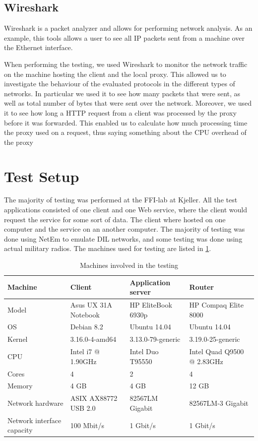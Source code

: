 \subsection{Wireshark}

Wireshark is a packet analyzer and allows for performing network
analysis\cite{wireshark-homepage}. As an example, this tools allows a user to
see all IP packets sent from a machine over the Ethernet interface.

When performing the testing, we used Wireshark to monitor the network traffic on
the machine hosting the client and the local proxy. This allowed us to
investigate the behaviour of the evaluated protocols in the different types of
networks. In particular we used it to see how many packets that were sent, as
well as total number of bytes that were sent over the network. Moreover, we used
it to see how long a HTTP request from a client was processed by the proxy
before it was forwarded. This enabled us to calculate how much processing time the
proxy used on a request, thus saying something about the CPU overhead of the proxy

\section{Test Setup}
\label{testing-environment}

The majority of testing was performed at the FFI-lab at Kjeller. All the test
applications consisted of one client and one Web service, where the client would
request the service for some sort of data. The client where hosted on one
computer and the service on an another computer. The majority of testing was
done using NetEm to emulate DIL networks, and some testing was done using actual
military radios. The machines used for testing are listed in
\cref{table-machines}.

\begin{table}[h]
\begin{tabularx}{\textwidth}{| l | X | X | X |}
\hline
  \textbf{Machine} & \textbf{Client} & \textbf{Application server} & \textbf{Router}\\ \hline
  Model & Asus UX 31A Notebook & HP EliteBook 6930p & HP Compaq Elite 8000 \\ \hline
  OS & Debian 8.2 & Ubuntu 14.04 & Ubuntu 14.04\\ \hline
  Kernel & 3.16.0-4-amd64 & 3.13.0-79-generic & 3.19.0-25-generic\\ \hline
  CPU & Intel i7 @ 1.90GHz & Intel Duo T95550 & Intel Quad Q9500 @ 2.83GHz \\ \hline
  Cores & 4 & 2 & 4\\ \hline
  Memory & 4 GB & 4 GB & 12 GB\\ \hline
  Network hardware & ASIX AX88772 USB 2.0 & 82567LM Gigabit & 82567LM-3 Gigabit\\ \hline
  Network interface capacity & 100 Mbit/s & 1 Gbit/s & 1 Gbit/s \\ \hline
\end{tabularx}
\caption{Machines involved in the testing}
\label{table-machines}
\end{table}

